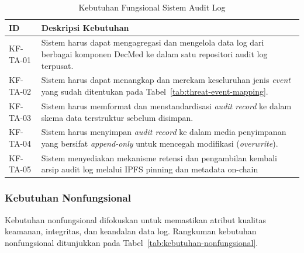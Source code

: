 \begin{table}[htbp]
    \centering
    \caption{Kebutuhan Fungsional Sistem Audit Log}
    \label{tab:kebutuhan-fungsional}
    \renewcommand{\arraystretch}{1.3}
    \begin{tabular}{|p{2cm}|p{11.5cm}|}
        \hline
        \textbf{ID} & \textbf{Deskripsi Kebutuhan} \\
        \hline
        KF-TA-01 & Sistem harus dapat mengagregasi dan mengelola data log dari berbagai komponen DecMed ke dalam satu repositori audit log terpusat. \\
        \hline
        KF-TA-02 & Sistem harus dapat menangkap dan merekam keseluruhan jenis \textit{event} yang sudah ditentukan pada Tabel~\ref{tab:threat-event-mapping}. \\
        \hline
        KF-TA-03 & Sistem harus memformat dan menstandardisasi \textit{audit record} ke dalam skema data terstruktur sebelum disimpan. \\
        \hline
        KF-TA-04 & Sistem harus menyimpan \textit{audit record} ke dalam media penyimpanan yang bersifat \textit{append-only} untuk mencegah modifikasi (\textit{overwrite}). \\
        \hline
        KF-TA-05 & Sistem menyediakan mekanisme retensi dan pengambilan kembali arsip audit log melalui IPFS pinning dan metadata on-chain \\
        \hline
    \end{tabular}
\end{table}

\subsubsection{Kebutuhan Nonfungsional}

Kebutuhan nonfungsional difokuskan untuk memastikan atribut kualitas keamanan, integritas, dan keandalan data log. Rangkuman kebutuhan nonfungsional ditunjukkan pada Tabel~\ref{tab:kebutuhan-nonfungsional}.

